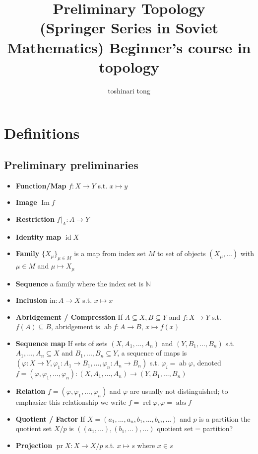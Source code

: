 \documentclass{article}
\title{Preliminary Topology\\(Springer Series in Soviet Mathematics) Beginner's course in topology}
\author{toshinari tong}
\DeclareMathOperator{\ima}{Im}
\DeclareMathOperator{\id}{id}
\DeclareMathOperator{\ab}{ab}
\DeclareMathOperator{\rel}{rel}
\DeclareMathOperator{\abs}{abs}
\DeclareMathOperator{\pr}{pr}
\begin{document}
\maketitle

\section{Definitions}
\subsection{Preliminary preliminaries}
\begin{itemize}
\item \textbf{Function/Map} \(f:X\to Y\) s.t. \(x\mapsto y\)
\item \textbf{Image} \(\ima f\)
\item \textbf{Restriction} \(f|_{A}:A\to Y\)
\item \textbf{Identity map} \(\id X\)
\item \textbf{Family} \(\{X_{\mu}\}_{\mu\in M}\) is a map from index set \(M\) to set of objects \((X_{\mu},...)\) with \(\mu\in M\) and \(\mu\mapsto X_{\mu}\)
\item \textbf{Sequence} a family where the index set is \(\mathbb{N}\)
\item \textbf{Inclusion} \(\text{in}:A\to X\) s.t. \(x\mapsto x\)
\item \textbf{Abridgement / Compression} If \(A\subseteq X,B\subseteq Y\) and \(f:X\to Y\) s.t. \(f(A)\subseteq B\), abridgement is \(\ab f:A\to B\), \(x\mapsto f(x)\)
\item \textbf{Sequence map} If sets of sets \((X,A_{1},...,A_{n})\) and \((Y,B_{1},...,B_{n})\) s.t. \(A_{1},...,A_{n}\subseteq X\) and \(B_{1},...,B_{n}\subseteq Y\),
    a sequence of maps is \((\varphi: X\to Y,\varphi_{1}: A_{1}\to B_{1},...,\varphi_{n}:A_{n}\to B_{n})\) s.t. \(\varphi_{i}=\ab \varphi\), denoted \(f=(\varphi,\varphi_{1},...,\varphi_{n}):(X,A_{1},...,A_{n})\to(Y,B_{1},...,B_{n})\)
\item \textbf{Relation} \(f=(\varphi,\varphi_{1},...,\varphi_{n})\) and \(\varphi\) are usually not distinguished; to emphasize this relationship we write \(f=\rel\varphi,\varphi=\abs f\)
\item \textbf{Quotient / Factor} If \(X=(a_{1},...,a_{n},b_{1},...,b_{m},...)\) and \(p\) is a partition the quotient set \(X/p\) is \(((a_{1},...),(b_{1},...),...)\) \color{red}quotient set = partition?\color{black}
\item \textbf{Projection} \(\pr X:X\to X/p\) s.t. \(x\mapsto s\) where \(x\in s\)

\end{itemize}
\end{document}
